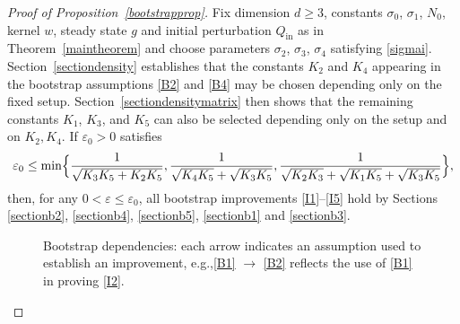 \documentclass[11pt]{article}
\newcommand{\eg}{e.g.,\xspace}
\theoremstyle{plain}
\theoremstyle{remark}
\newcommand{\Bset}[1]{\Bigl\{#1\Bigr\}}
\newcommand{\ep}{\varepsilon}
\newcommand{\Qin}{Q_{\mathrm{in}}}
\begin{document}
\begin{proof}[Proof of Proposition~\ref{bootstrapprop}]
Fix dimension $d\geq 3$, constants $\sigma_0$, $\sigma_1$, $N_0$, kernel $w$, steady state $g$ and initial perturbation $\Qin$ as in Theorem~\ref{maintheorem} and choose parameters $\sigma_2$, $\sigma_3$, $\sigma_4$ satisfying \eqref{sigmai}. Section~\ref{sectiondensity} establishes that the constants $K_2$ and $K_4$ appearing in the bootstrap assumptions \eqref{B2} and \eqref{B4} may be chosen depending only on the fixed setup. Section~\ref{sectiondensitymatrix} then shows that the remaining constants $K_1$, $K_3$, and $K_5$ can also be selected depending only on the setup and on $K_2, K_4$. If $\ep_0>0$ satisfies
\begin{align*}
\ep_0\leq\min\Bset{\frac{1}{\sqrt{K_3K_5+K_2K_5}},\frac{1}{\sqrt{K_4K_5}+\sqrt{K_3K_5}},\frac{1}{\sqrt{K_2K_3}+\sqrt{K_1K_5}+\sqrt{K_3K_5}}},
\end{align*}
then, for any $0<\ep\leq \ep_0$, all bootstrap improvements \eqref{I1}--\eqref{I5} hold by Sections \ref{sectionb2}, \ref{sectionb4}, \ref{sectionb5}, \ref{sectionb1} and \ref{sectionb3}.

\begin{figure}[ht]
\centering
{}
\captionsetup{width=.7\linewidth}
\caption{Bootstrap dependencies: each arrow indicates an assumption used to establish an improvement, \eg \eqref{B1} $\rightarrow$ \eqref{B2} reflects the use of \eqref{B1} in proving \eqref{I2}.}


\end{figure}
\end{proof}
\end{document}
